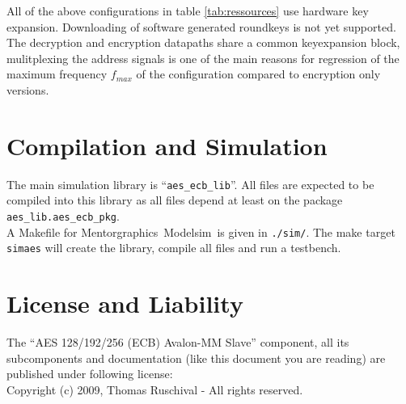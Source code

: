 \documentclass{ruschidoc}
\begin{document}
All of the above configurations in table \ref{tab:ressources} use hardware key
expansion. Downloading of software generated roundkeys is not yet supported. The
decryption and encryption datapaths share a common keyexpansion block, mulitplexing
the address signals is one of the main reasons for regression of the maximum
frequency $f_{max}$ of the configuration compared to encryption only versions. 

\section{Compilation and Simulation}
\label{sec:compilation}
The main simulation library is ``\texttt{aes\_ecb\_lib}''. All files are expected to be
compiled into this library as all files depend at least on the package
\texttt{aes\_lib.aes\_ecb\_pkg}. \\
A Makefile for Mentorgraphics\rtm\ Modelsim\rtm\ is given in \texttt{./sim/}. The
make target \texttt{simaes} will create the library, compile all files and run a
testbench.\\

\newpage
\section{License and Liability}
\label{sec:license}
The ``AES 128/192/256 (ECB) Avalon\rtm-MM Slave'' component, all its subcomponents
and documentation (like this document you are reading) are published under following
license:\\

Copyright (c) 2009, Thomas Ruschival - All rights reserved.
\end{document}
